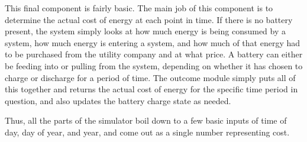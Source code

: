 This final component is fairly basic. The main job of this component is to determine the actual cost of energy at each point in time. If there is no battery present, the system simply looks at how much energy is being consumed by a system, how much energy is entering a system, and how much of that energy had to be purchased from the utility company and at what price. A battery can either be feeding into or pulling from the system, depending on whether it has chosen to charge or discharge for a period of time. The outcome module simply puts all of this together and returns the actual cost of energy for the specific time period in question, and also updates the battery charge state as needed.

Thus, all the parts of the simulator boil down to a few basic inputs of time of day, day of year, and year, and come out as a single number representing cost.